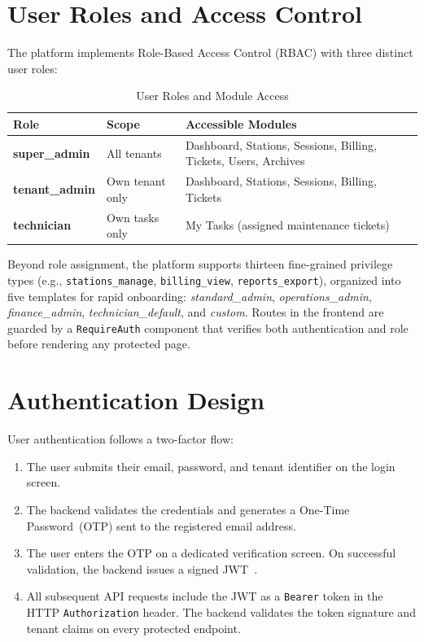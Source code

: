 \documentclass[12pt,a4paper]{report}
\begin{document}
\section{User Roles and Access Control}

The platform implements Role-Based Access Control (RBAC) with three distinct user roles:

\begin{table}[h!]
  \centering
  \caption{User Roles and Module Access}
  \label{tab:user-roles}
  \renewcommand{\arraystretch}{1.3}
  \begin{tabular}{>{\bfseries}p{3.2cm} p{3cm} p{7cm}}
    \toprule
    Role           & Scope           & Accessible Modules \\
    \midrule
    super\_admin   & All tenants     & Dashboard, Stations, Sessions, Billing, Tickets,
                                       Users, Archives \\
    tenant\_admin  & Own tenant only & Dashboard, Stations, Sessions, Billing, Tickets \\
    technician     & Own tasks only  & My Tasks (assigned maintenance tickets) \\
    \bottomrule
  \end{tabular}
\end{table}

Beyond role assignment, the platform supports thirteen fine-grained privilege types
(e.g., \texttt{stations\_manage}, \texttt{billing\_view}, \texttt{reports\_export}), organized
into five templates for rapid onboarding: \textit{standard\_admin}, \textit{operations\_admin},
\textit{finance\_admin}, \textit{technician\_default}, and \textit{custom}. Routes in the
frontend are guarded by a \texttt{RequireAuth} component that verifies both authentication and
role before rendering any protected page.

\section{Authentication Design}

User authentication follows a two-factor flow:

\begin{enumerate}
  \item The user submits their email, password, and tenant identifier on the login screen.
  \item The backend validates the credentials and generates a One-Time Password~(OTP) sent to
        the registered email address.
  \item The user enters the OTP on a dedicated verification screen. On successful validation,
        the backend issues a signed JWT~\autocite{rfc7519}.
  \item All subsequent API requests include the JWT as a \texttt{Bearer} token in the HTTP
        \texttt{Authorization} header. The backend validates the token signature and tenant
        claims on every protected endpoint.
\end{enumerate}
\end{document}
